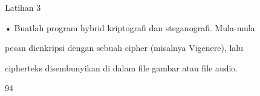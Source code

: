 \documentclass{article}
\begin{document}

Latihan 3 

• Buatlah program hybrid kriptografi dan steganografi. Mula-mula 

pesan dienkripsi dengan sebuah cipher (misalnya Vigenere), lalu 

cipherteks disembunyikan di dalam file gambar atau file audio. 

94
\end{document}

